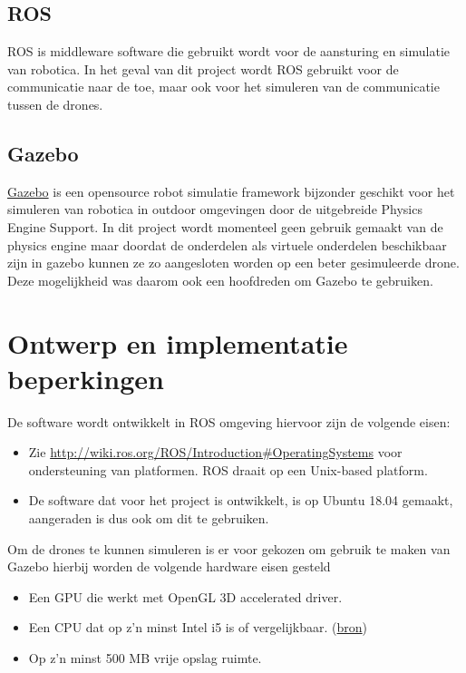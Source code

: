 \documentclass[a4paper, 11pt, oneside]{report}
\begin{document}
\subsection{ROS}
\label{inleiding:werkomgeving:ros}
ROS is middleware software die gebruikt wordt voor de aansturing en simulatie van robotica. 
In het geval van dit project wordt ROS gebruikt voor de communicatie naar de  toe, maar ook voor het simuleren van de  communicatie tussen de drones. 

\subsection{Gazebo}
\label{inleiding:werkomgeving:gazebo}

\href{http://gazebosim.org/}{Gazebo} is een opensource robot simulatie framework bijzonder geschikt voor het simuleren van robotica in outdoor omgevingen door de uitgebreide Physics Engine Support.
In dit project wordt momenteel geen gebruik gemaakt van de physics engine maar doordat de onderdelen als virtuele onderdelen beschikbaar zijn in gazebo kunnen ze zo aangesloten worden op een beter gesimuleerde drone.
Deze mogelijkheid was daarom ook een hoofdreden om Gazebo te gebruiken.

\section{Ontwerp en implementatie beperkingen}
\label{inleiding:ontwerpberkingen}

De software wordt ontwikkelt in ROS omgeving hiervoor zijn de volgende eisen:
\begin{itemize}
	\item  Zie \href{http://wiki.ros.org/ROS/Introduction\#Operating\_Systems}{http://wiki.ros.org/ROS/Introduction\#Operating\textunderscore Systems} voor ondersteuning van platformen. ROS draait op een Unix-based platform.
	\item De software dat voor het project is ontwikkelt, is op Ubuntu 18.04 gemaakt, aangeraden is dus ook om dit te gebruiken.
\end{itemize}

Om de drones te kunnen simuleren is er voor gekozen om gebruik te maken van Gazebo hierbij worden de volgende hardware eisen gesteld

\begin{itemize}
	\item Een GPU die werkt met OpenGL 3D accelerated driver.
	\item Een CPU dat op z'n minst Intel i5 is of vergelijkbaar. (\href{http://gazebosim.org/tutorials?tut=guided_b1&cat=}{bron})
	\item Op z'n minst 500 MB vrije opslag ruimte.
\end{itemize}
\end{document}

